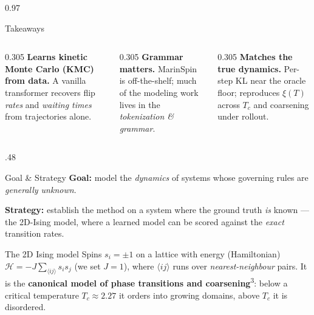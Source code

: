 \documentclass[final]{beamer}
\newcommand{\keypt}[1]{\textcolor{oabrown}{\textbf{#1}}}
\newcommand{\refcite}[1]{\textsuperscript{\textcolor{oablue}{#1}}}
\let\origtextbf\textbf
\renewcommand{\textbf}[1]{\textcolor{oabrown}{\origtextbf{#1}}}
\begin{document}
\begin{frame}[t]
\begin{columns}
\begin{column}{0.97\paperwidth}
  \begin{block}{Takeaways}
    \begin{columns}[t,onlytextwidth]
      \begin{column}{0.305\paperwidth}
        \keypt{Learns kinetic Monte Carlo (KMC) from data.} A vanilla transformer recovers flip
        \emph{rates} and \emph{waiting times} from trajectories alone.
      \end{column}
      \begin{column}{0.305\paperwidth}
        \keypt{Grammar matters.} MarinSpin is off-the-shelf; much of the modeling work lives in
        the \emph{tokenization \& grammar}.
      \end{column}
      \begin{column}{0.305\paperwidth}
        \keypt{Matches the true dynamics.} Per-step KL near the oracle floor; reproduces $\xi(T)$
        across $T_c$ and coarsening under rollout.
      \end{column}
    \end{columns}
  \end{block}
\end{column}
\end{columns}
\vspace{6pt}

\begin{columns}[t]

\begin{column}{.48\paperwidth}

  \begin{block}{Goal \& Strategy}
    \keypt{Goal:} model the \emph{dynamics} of systems whose governing rules are \emph{generally
    unknown}.

    \medskip
    \keypt{Strategy:} establish the method on a system where the ground truth \emph{is} known ---
    the 2D-Ising model, where a learned model can be scored against the \emph{exact} transition rates.
  \end{block}

  \begin{block}{The 2D Ising model}
    Spins $s_i=\pm1$ on a lattice with energy (Hamiltonian) $\mathcal{H}=-J\sum_{\langle ij\rangle} s_i s_j$
    (we set $J{=}1$), where $\langle ij\rangle$ runs over \emph{nearest-neighbour} pairs. It is the \keypt{canonical model of phase
    transitions and coarsening}\refcite{3}: below a critical temperature $T_c\approx2.27$ it orders into
    growing domains, above $T_c$ it is disordered.
  \end{block}


\end{column}
\end{columns}
\end{frame}
\end{document}
